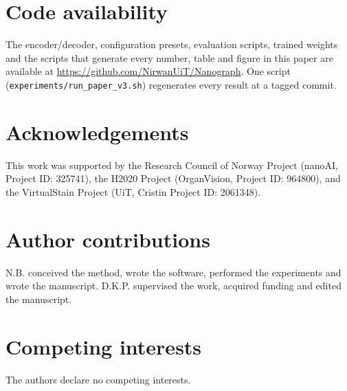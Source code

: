 \documentclass[10pt,a4paper]{article}
\begin{document}
\section*{Code availability}
The encoder/decoder, configuration presets, evaluation scripts, trained
weights and the scripts that generate every number, table and figure in this
paper are available at \url{https://github.com/NirwanUiT/Nanograph}. One script
(\texttt{experiments/run\_paper\_v3.sh}) regenerates every result at a
tagged commit.

\section*{Acknowledgements}
This work was supported by the Research Council of Norway Project (nanoAI,
Project ID: 325741), the H2020 Project (OrganVision, Project ID: 964800),
and the VirtualStain Project (UiT, Cristin Project ID: 2061348).

\section*{Author contributions}
N.B. conceived the method, wrote the software, performed the experiments
and wrote the manuscript. D.K.P. supervised the work, acquired funding and
edited the manuscript.

\section*{Competing interests}
The authors declare no competing interests.



\end{document}
